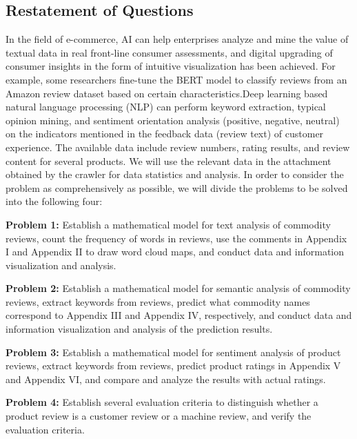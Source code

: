 \documentclass[12pt]{mcmthesis}
\begin{document}
\subsection{Restatement of Questions}
In the field of e-commerce, AI can help enterprises analyze and mine the value of textual data in real front-line consumer assessments, and digital upgrading of consumer insights in the form of intuitive visualization has been achieved. For example, some researchers fine-tune the BERT model to classify reviews from an Amazon review dataset based on certain characteristics.\cite{1}Deep learning based natural language processing (NLP) can perform keyword extraction, typical opinion mining, and sentiment orientation analysis (positive, negative, neutral) on the indicators mentioned in the feedback data (review text) of customer experience. The available data include review numbers, rating results, and review content for several products. 
We will use the relevant data in the attachment obtained by the crawler for data statistics and analysis. In order to consider the problem as comprehensively as possible, we will divide the problems to be solved into the following four:

	\noindent\textbf{Problem 1:} Establish a mathematical model for text analysis of commodity reviews, count the frequency of words in reviews, use the comments in Appendix I and Appendix II to draw word cloud maps, and conduct data and information visualization and analysis.  
	
	\noindent\textbf{Problem 2:} Establish a mathematical model for semantic analysis of commodity reviews, extract keywords from reviews, predict what commodity names correspond to Appendix III and Appendix IV, respectively, and conduct data and information visualization and analysis of the prediction results. 
	
	\noindent\textbf{Problem 3:} Establish a mathematical model for sentiment analysis of product reviews, extract keywords from reviews, predict product ratings in Appendix V and Appendix VI, and compare and analyze the results with actual ratings. 
	
	\noindent\textbf{Problem 4:} Establish several evaluation criteria to distinguish whether a product review is a customer review or a machine review, and verify the evaluation criteria.
\newpage
\end{document}
